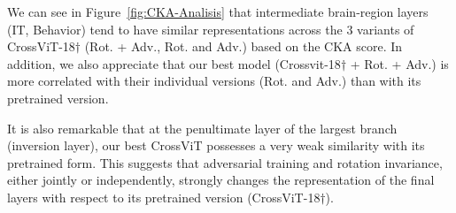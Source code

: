 \documentclass{article} %
\begin{document}
We can see in Figure~\ref{fig:CKA-Analisis} that intermediate brain-region layers (IT, Behavior) tend to have similar representations across the 3 variants of CrossViT-18$\dagger$ (Rot. + Adv., Rot. and Adv.) based on the CKA score. In addition, we also appreciate that our best model (Crossvit-18$\dagger$ + Rot. + Adv.) is more correlated with their individual versions (Rot. and Adv.) than with its pretrained version.

It is also remarkable that at the penultimate layer of the largest branch (inversion layer), our best CrossViT possesses a very weak similarity with its pretrained form. This suggests that adversarial training and rotation invariance, either jointly or independently, strongly changes the representation of the final layers with respect to its pretrained version (CrossViT-18$\dagger$).
 
\end{document}
